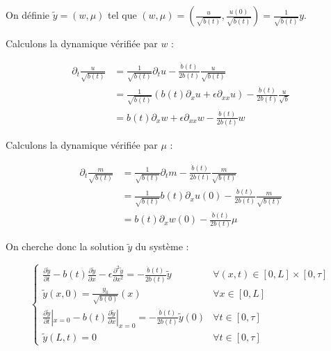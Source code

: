 \documentclass[a4paper]{article}
\begin{document}
On définie $\tilde{y}=(w,\mu)$ tel que 
$(w,\mu)=\displaystyle (\frac{u}{\sqrt{b(t)} }, \frac{u(0)}{\sqrt{b(t)} }) = \frac{1}{\sqrt{b(t)}} y$.

Calculons la dynamique vérifiée par $w$ :

\[\begin{split}
\partial_t \displaystyle \frac{u}{\sqrt{b(t)}} & = \frac{1}{\sqrt{b(t)}} \partial_t u
                                                    -  \frac{\dot{b}(t)}{2 b(t)} \frac{u}{\sqrt{b(t)}}\\
												& = \frac{1}{\sqrt{b(t)}}
												   (b(t) \partial_x u 
												  +\epsilon \partial_{xx} u)
												  - \frac{\dot{b} (t) }{2b(t)} \frac{u}{\sqrt{b} }\\
												& = b(t) \partial_x  w
												  +\epsilon \partial_{xx} w 
												  - \frac{\dot{b} (t) }{2b(t) } w 
\end{split}\]

Calculons la dynamique vérifiée par $\mu$ :

\[
\begin{split}
	\displaystyle \partial_t \frac{m}{\sqrt{b(t)}} &= \frac{1}{\sqrt{b(t)}} \partial_t m
	                                                 - \frac{\dot{b}(t)}{2b(t)}\frac{m}{\sqrt{b(t)}}\\
												  &= \frac{1}{\sqrt{b(t)}} b(t) \partial_x u(0)
												  - \frac{\dot{b}(t)}{2b(t)} \frac{m}{\sqrt{b(t)}}\\
												  &= b(t) \partial_x w(0)
												  - \frac{\dot{b}(t)}{2b(t)} \mu
\end{split}
\]

On cherche donc la solution $\tilde{y}$ du système :

\begin{equation}
\label{eq:cas3b}
\begin{cases}
 \displaystyle \frac{\partial \tilde{y} }{\partial t}
 - b(t) \frac{\partial \tilde{y} }{\partial x}  
 - \epsilon \frac{\partial^2 \tilde{y}} {\partial x^2}
 =  - \frac{\dot{b} (t) }{2b(t) } \tilde{y}  & \forall (x,t) \in [0,L] \times [0, \tau]\\
 \displaystyle \tilde{y}(x,0) = \frac{y_{0}}{\sqrt{b(0)}} (x) & \forall x \in [0,L] \\
 \displaystyle \frac{\partial \tilde{y}}{\partial t}|_{x=0}
 - b(t) \frac{\partial \tilde{y}} {\partial x}|_{x=0} = - \frac{\dot{b}(t)}{2b(t)} \tilde{y}(0) & \forall t \in [0,\tau]\\
 \tilde{y}(L,t)=0 & \forall t \in [0,\tau]
\end{cases}
\end{equation}
\end{document}

